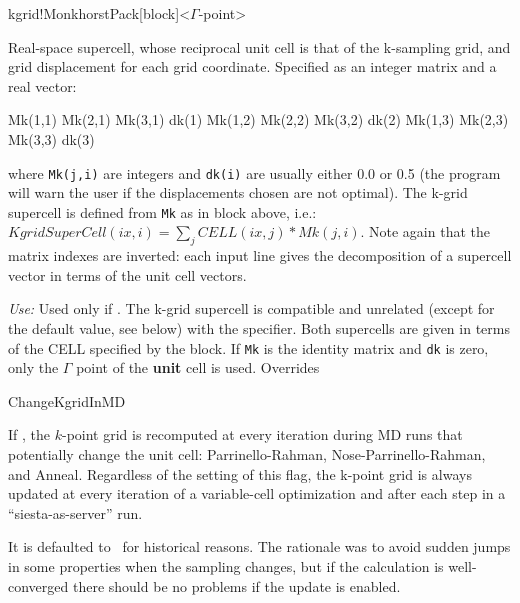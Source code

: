 \begin{fdfentry}{kgrid!MonkhorstPack}[block]<$\Gamma$-point>
  
  Real-space supercell, whose reciprocal unit cell is that of the
  k-sampling grid, and grid displacement for each grid coordinate.
  Specified as an integer matrix and a real vector:

  \begin{fdfexample}
        Mk(1,1)  Mk(2,1)  Mk(3,1)   dk(1)
        Mk(1,2)  Mk(2,2)  Mk(3,2)   dk(2)
        Mk(1,3)  Mk(2,3)  Mk(3,3)   dk(3)
  \end{fdfexample}
  
  where \texttt{Mk(j,i)} are integers and \texttt{dk(i)} are usually
  either 0.0 or 0.5 (the program will warn the user if the displacements
  chosen are not optimal).
  The k-grid supercell is defined from \texttt{Mk}
  as in block  above, i.e.:
  $KgridSuperCell(ix,i) = \sum_j CELL(ix,j)*Mk(j,i)$.
  Note again that the matrix indexes are inverted: each input line
  gives the decomposition of a supercell vector in terms of the unit
  cell vectors.
  
  
  \textit{Use:} Used only if  .  The
  k-grid supercell is compatible and unrelated (except for the default
  value, see below) with the  specifier. Both
  supercells are given in terms of the CELL specified by the
   block.  If \texttt{Mk} is the identity matrix
  and \texttt{dk} is zero, only the $\Gamma$ point of the
  \textbf{unit} cell is used.  Overrides 

\end{fdfentry}

\begin{fdflogicalF}{ChangeKgridInMD}

  If \fdftrue, the $k$-point grid is recomputed at every
  iteration during MD runs that potentially change the unit cell:
  Parrinello-Rahman, Nose-Parrinello-Rahman, and Anneal. Regardless of
  the setting of this flag, the k-point grid is always updated at
  every iteration of a variable-cell optimization and after each step
  in a ``siesta-as-server'' run.

  It is defaulted to \fdffalse\ for historical reasons. The rationale
  was to avoid sudden jumps in some properties when the sampling
  changes, but if the calculation is well-converged there should be no
  problems if the update is enabled.
  
\end{fdflogicalF}


